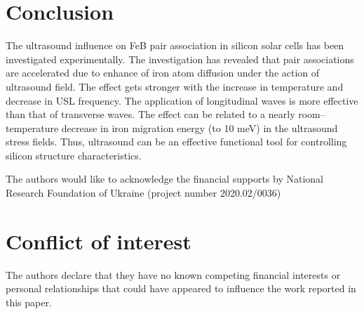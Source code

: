 \section{Conclusion}

The ultrasound influence on
FeB pair association in silicon solar cells has been investigated experimentally.
The investigation has revealed that pair associations are accelerated due to enhance of iron
atom diffusion under the action of ultrasound field.
The effect gets stronger with the increase in temperature and decrease in USL frequency.
The application of longitudinal waves is more effective than that of transverse waves.
The effect can be related to a nearly room--temperature decrease in iron migration energy (to 10 meV) in the ultrasound stress ﬁelds.
Thus, ultrasound can be an effective functional tool for controlling silicon structure characteristics.


\begin{acknowledgements}
The authors would like to acknowledge the financial supports by National Research Foundation  of Ukraine
(project number 2020.02/0036)
\end{acknowledgements}


%
\section*{Conflict of interest}

The authors declare that they have no known competing financial interests or personal relationships that could have appeared to influence the work reported in this paper.







